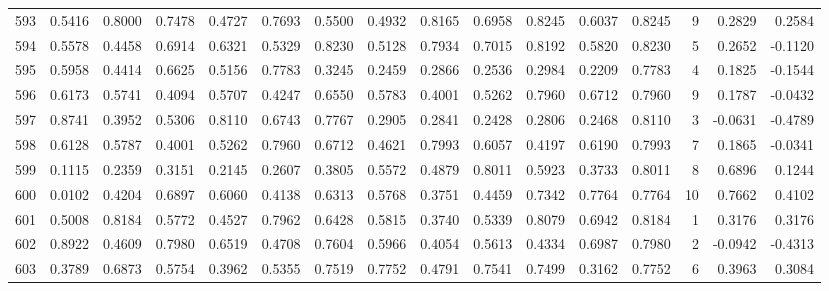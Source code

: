 \begin{tabular}{lrrrrrrrrrrrrrrr}
593 &      0.5416 &  0.8000 &  0.7478 &  0.4727 &  0.7693 &  0.5500 &  0.4932 &  0.8165 &  0.6958 &  0.8245 &   0.6037 &     0.8245 &      9 &                    0.2829 &                     0.2584 \\
594 &      0.5578 &  0.4458 &  0.6914 &  0.6321 &  0.5329 &  0.8230 &  0.5128 &  0.7934 &  0.7015 &  0.8192 &   0.5820 &     0.8230 &      5 &                    0.2652 &                    -0.1120 \\
595 &      0.5958 &  0.4414 &  0.6625 &  0.5156 &  0.7783 &  0.3245 &  0.2459 &  0.2866 &  0.2536 &  0.2984 &   0.2209 &     0.7783 &      4 &                    0.1825 &                    -0.1544 \\
596 &      0.6173 &  0.5741 &  0.4094 &  0.5707 &  0.4247 &  0.6550 &  0.5783 &  0.4001 &  0.5262 &  0.7960 &   0.6712 &     0.7960 &      9 &                    0.1787 &                    -0.0432 \\
597 &      0.8741 &  0.3952 &  0.5306 &  0.8110 &  0.6743 &  0.7767 &  0.2905 &  0.2841 &  0.2428 &  0.2806 &   0.2468 &     0.8110 &      3 &                   -0.0631 &                    -0.4789 \\
598 &      0.6128 &  0.5787 &  0.4001 &  0.5262 &  0.7960 &  0.6712 &  0.4621 &  0.7993 &  0.6057 &  0.4197 &   0.6190 &     0.7993 &      7 &                    0.1865 &                    -0.0341 \\
599 &      0.1115 &  0.2359 &  0.3151 &  0.2145 &  0.2607 &  0.3805 &  0.5572 &  0.4879 &  0.8011 &  0.5923 &   0.3733 &     0.8011 &      8 &                    0.6896 &                     0.1244 \\
600 &      0.0102 &  0.4204 &  0.6897 &  0.6060 &  0.4138 &  0.6313 &  0.5768 &  0.3751 &  0.4459 &  0.7342 &   0.7764 &     0.7764 &     10 &                    0.7662 &                     0.4102 \\
601 &      0.5008 &  0.8184 &  0.5772 &  0.4527 &  0.7962 &  0.6428 &  0.5815 &  0.3740 &  0.5339 &  0.8079 &   0.6942 &     0.8184 &      1 &                    0.3176 &                     0.3176 \\
602 &      0.8922 &  0.4609 &  0.7980 &  0.6519 &  0.4708 &  0.7604 &  0.5966 &  0.4054 &  0.5613 &  0.4334 &   0.6987 &     0.7980 &      2 &                   -0.0942 &                    -0.4313 \\
603 &      0.3789 &  0.6873 &  0.5754 &  0.3962 &  0.5355 &  0.7519 &  0.7752 &  0.4791 &  0.7541 &  0.7499 &   0.3162 &     0.7752 &      6 &                    0.3963 &                     0.3084 \\

\end{tabular}
